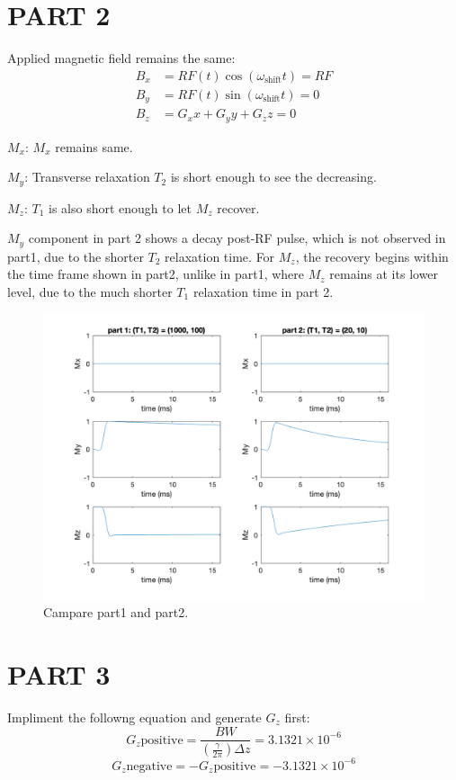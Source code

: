 \documentclass{report}
\begin{document}
\section[short]{PART 2}
Applied magnetic field remains the same:
\begin{align*}
B_x &= RF(t) \cos(\omega_{\text{shift}} t) = RF\\
B_y &= RF(t) \sin(\omega_{\text{shift}} t) = 0\\
B_z &= G_{x} x + G_{y} y + G_{z} z = 0
\end{align*}

$M_x$: $M_x$ remains same.\vspace{\baselineskip}

$M_y$: Transverse relaxation $T_2$ is short enough to see the decreasing.\vspace{\baselineskip}

$M_z$: $T_1$ is also short enough to let $M_z$ recover.\vspace{\baselineskip}

$M_y$ component in part 2 shows a decay post-RF pulse, which is not observed in part1, 
due to the shorter $T_2$ relaxation time. For $M_z$, the recovery begins within the time frame shown
 in part2, unlike in part1, where $M_z$ remains at its lower level, due to the much shorter $T_1$
 relaxation time in part 2.

\begin{figure}[hb]
    \centering
    \includegraphics[width=1\textwidth]{2.png}
    \caption{Campare part1 and part2.}
\end{figure}  
\newpage
\section[short]{PART 3}
Impliment the followng equation and generate $G_z$ first:
\[
G_z{\text{positive}} = \frac{BW}{\left( \frac{\gamma}{2\pi} \right) \Delta z} = 3.1321 \times 10^{-6}
\]
\[
G_z{\text{negative}} = -G_z{\text{positive}} = -3.1321 \times 10^{-6}
\]
\end{document}
